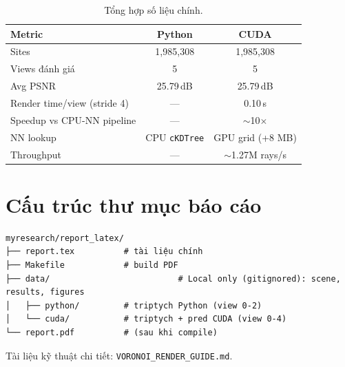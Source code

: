 \documentclass[11pt,a4paper]{article}
\begin{document}
\begin{table}[H]
\centering
\caption{Tổng hợp số liệu chính.}
\label{tab:summary}
\begin{tabular}{lcc}
\toprule
\textbf{Metric} & \textbf{Python} & \textbf{CUDA} \\
\midrule
Sites & 1,985,308 & 1,985,308 \\
Views đánh giá & 5 & 5 \\
Avg PSNR & 25.79\,dB & 25.79\,dB \\
Render time/view (stride 4) & --- & 0.10\,s \\
Speedup vs CPU-NN pipeline & --- & $\sim$10$\times$ \\
NN lookup & CPU \texttt{cKDTree} & GPU grid (+8 MB) \\
Throughput & --- & $\sim$1.27M rays/s \\
\bottomrule
\end{tabular}
\end{table}

\section{Cấu trúc thư mục báo cáo}

\begin{verbatim}
myresearch/report_latex/
├── report.tex          # tài liệu chính
├── Makefile            # build PDF
├── data/                          # Local only (gitignored): scene, results, figures
│   ├── python/         # triptych Python (view 0-2)
│   └── cuda/           # triptych + pred CUDA (view 0-4)
└── report.pdf          # (sau khi compile)
\end{verbatim}

Tài liệu kỹ thuật chi tiết: \texttt{VORONOI\_RENDER\_GUIDE.md}.
\end{document}
